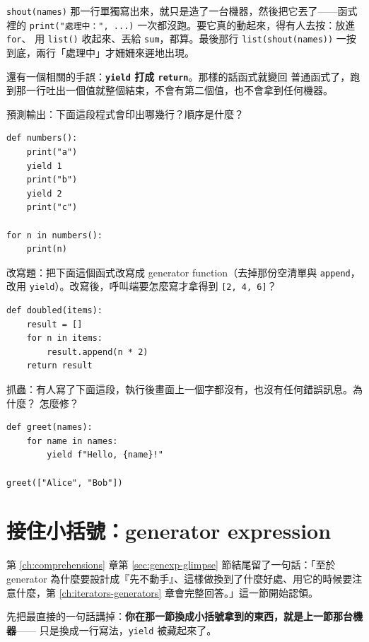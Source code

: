 \texttt{shout(names)} 那一行單獨寫出來，就只是造了一台機器，然後把它丟了——函式裡的
\texttt{print("處理中：", ...)} 一次都沒跑。要它真的動起來，得有人去按：放進 \texttt{for}、
用 \texttt{list()} 收起來、丟給 \texttt{sum}，都算。最後那行 \texttt{list(shout(names))}
一按到底，兩行「處理中」才姍姍來遲地出現。

還有一個相關的手誤：\textbf{\texttt{yield} 打成 \texttt{return}}。那樣的話函式就變回
普通函式了，跑到那一行吐出一個值就整個結束，不會有第二個值，也不會拿到任何機器。

\begin{drills}[label=drills:yield-basics]
\item 預測輸出：下面這段程式會印出哪幾行？順序是什麼？
\begin{verbatim}
def numbers():
    print("a")
    yield 1
    print("b")
    yield 2
    print("c")

for n in numbers():
    print(n)
\end{verbatim}
\item 改寫題：把下面這個函式改寫成 generator function（去掉那份空清單與
\texttt{append}，改用 \texttt{yield}）。改寫後，呼叫端要怎麼寫才拿得到
\texttt{[2, 4, 6]}？
\begin{verbatim}
def doubled(items):
    result = []
    for n in items:
        result.append(n * 2)
    return result
\end{verbatim}
\item 抓蟲：有人寫了下面這段，執行後畫面上一個字都沒有，也沒有任何錯誤訊息。為什麼？
怎麼修？
\begin{verbatim}
def greet(names):
    for name in names:
        yield f"Hello, {name}!"

greet(["Alice", "Bob"])
\end{verbatim}
\end{drills}

\section{接住小括號：generator expression}
\label{sec:generator-expression}

第 \ref{ch:comprehensions} 章第 \ref{sec:genexp-glimpse} 節結尾留了一句話：「至於
generator 為什麼要設計成『先不動手』、這樣做換到了什麼好處、用它的時候要注意什麼，第
\ref{ch:iterators-generators} 章會完整回答。」這一節開始認領。

先把最直接的一句話講掉：\textbf{你在那一節換成小括號拿到的東西，就是上一節那台機器}——
只是換成一行寫法，\texttt{yield} 被藏起來了。

